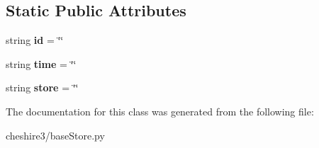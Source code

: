 \subsection*{Static Public Attributes}
\begin{DoxyCompactItemize}
\item 
\hypertarget{classcheshire3_1_1base_store_1_1_deleted_object_ad36d9d2727b55409027e0cc669b9f478}{string {\bfseries id} = \char`\"{}\char`\"{}}\label{classcheshire3_1_1base_store_1_1_deleted_object_ad36d9d2727b55409027e0cc669b9f478}

\item 
\hypertarget{classcheshire3_1_1base_store_1_1_deleted_object_aa73a72f8a59ae6d5fbdf673fe40a9467}{string {\bfseries time} = \char`\"{}\char`\"{}}\label{classcheshire3_1_1base_store_1_1_deleted_object_aa73a72f8a59ae6d5fbdf673fe40a9467}

\item 
\hypertarget{classcheshire3_1_1base_store_1_1_deleted_object_ad2f7b21f3291daba27c7a3ca480c438a}{string {\bfseries store} = \char`\"{}\char`\"{}}\label{classcheshire3_1_1base_store_1_1_deleted_object_ad2f7b21f3291daba27c7a3ca480c438a}

\end{DoxyCompactItemize}


The documentation for this class was generated from the following file\-:\begin{DoxyCompactItemize}
\item 
cheshire3/base\-Store.\-py\end{DoxyCompactItemize}

